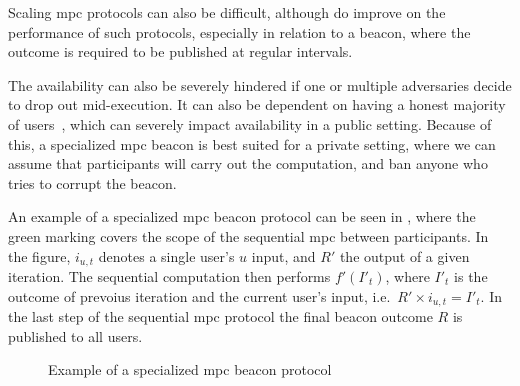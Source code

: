 Scaling \gls{mpc} protocols can also be difficult, although  do improve on the performance of such protocols, especially in relation to a beacon, where the outcome is required to be published at regular intervals.

The availability can also be severely hindered if one or multiple adversaries decide to drop out mid-execution.
It can also be dependent on having a honest majority of users~\cite{cascudo2017scrape}, which can severely impact availability in a public setting.
Because of this, a specialized \gls{mpc} beacon is best suited for a private setting, where we can assume that participants will carry out the computation, and ban anyone who tries to corrupt the beacon.

An example of a specialized \gls{mpc} beacon protocol can be seen in , where the green marking covers the scope of the sequential \gls{mpc} between participants.
In the figure, $i_{u,t}$ denotes a single user's $u$ input, and $R'$ the output of a given iteration.
The sequential computation then performs $f'(I'_t)$, where $I'_t$ is the outcome of prevoius iteration and the current user's input, i.e.\ $R' \times i_{u,t} = I'_t$.
In the last step of the sequential \gls{mpc} protocol the final beacon outcome $R$ is published to all users.

\begin{figure}[htb]
    \centering
    \footnotesize
    \caption{Example of a specialized \gls{mpc} beacon protocol}\label{fig:mpc_beacon}
\end{figure}



